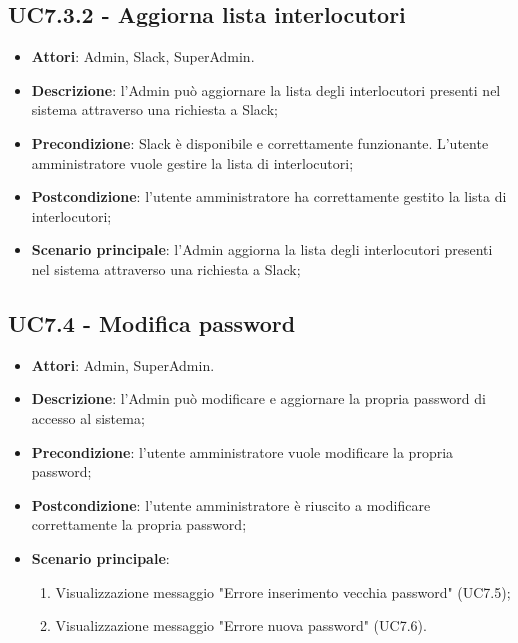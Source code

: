 \documentclass[../AnalisiDeiRequisiti_v3.0.0.tex]{subfiles}
\begin{document}
\subsection{UC7.3.2 - Aggiorna lista interlocutori} 
\label{sssec:UC7.3.2} 
\begin{itemize} 
\item \textbf{Attori}: Admin, Slack, SuperAdmin.
\item \textbf{Descrizione}: l'Admin può aggiornare la lista degli interlocutori presenti nel sistema attraverso una richiesta a Slack;
\item \textbf{Precondizione}: Slack è disponibile e correttamente funzionante. L'utente amministratore vuole gestire la lista di interlocutori;
\item \textbf{Postcondizione}: l'utente amministratore ha correttamente gestito la lista di interlocutori;
\item \textbf{Scenario principale}: l'Admin aggiorna la lista degli interlocutori presenti nel sistema attraverso una richiesta a Slack;
\end{itemize} 
\subsection{UC7.4 - Modifica password} 
\label{sssec:UC7.4} 
\begin{itemize} 
\item \textbf{Attori}: Admin, SuperAdmin.
\item \textbf{Descrizione}: l'Admin può modificare e aggiornare la propria password di accesso al sistema;
\item \textbf{Precondizione}: l'utente amministratore vuole modificare la propria password;
\item \textbf{Postcondizione}: l'utente amministratore è riuscito a modificare correttamente la propria password;
\item \textbf{Scenario principale}: \begin{enumerate}\item Visualizzazione messaggio "Errore inserimento vecchia password" (UC7.5);\item Visualizzazione messaggio "Errore nuova password" (UC7.6). 
 \end{enumerate}
\end{itemize} 
\end{document}
